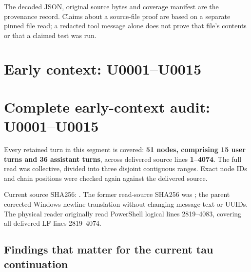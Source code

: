 The decoded JSON, original source bytes and coverage manifest are the
provenance record. Claims about a source-file proof are based on a
separate pinned file read; a redacted tool message alone does not prove
that file's contents or that a claimed test was run.

\clearpage

\section{Early context: U0001--U0015}\label{TranscriptLedgerStage:early-context-u0001u0015}

\section{Complete early-context audit:
U0001--U0015}\label{TranscriptLedgerStage:complete-early-context-audit-u0001u0015}

Every retained turn in this segment is covered: \textbf{51 nodes,
comprising 15 user turns and 36 assistant turns}, across delivered
source lines \textbf{1--4074}. The full read was collective, divided
into three disjoint contiguous ranges. Exact node IDs and chain
positions were checked again against the delivered source.

Current source SHA256:
\protect{}.
The former read-source SHA256 was
\protect{};
the parent corrected Windows newline translation without changing
message text or UUIDs. The physical reader originally read PowerShell
logical lines 2819--4083, covering all delivered LF lines 2819--4074.

\subsection{Findings that matter for the current tau
continuation}\label{TranscriptLedgerStage:findings-that-matter-for-the-current-tau-continuation}

